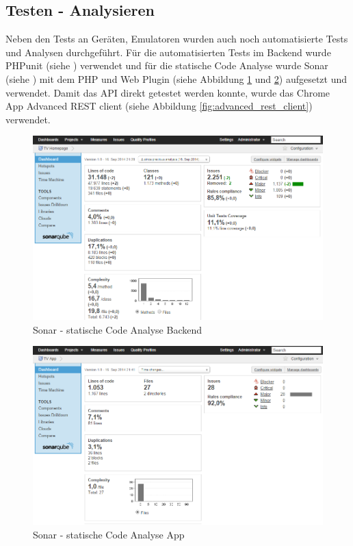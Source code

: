 \newpage
\subsection{Testen - Analysieren}
Neben den Tests an Geräten, Emulatoren wurden auch noch automatisierte Tests und Analysen durchgeführt. Für die automatisierten Tests im Backend wurde PHPunit (siehe \cite{phpunit}) verwendet und für die statische Code Analyse wurde Sonar (siehe \cite{sonar}) mit dem PHP und Web Plugin (siehe Abbildung \ref{fig:sonar_backend} und \ref{fig:sonar_app}) aufgesetzt und verwendet. Damit das API direkt getestet werden konnte, wurde das Chrome App Advanced REST client (siehe Abbildung \ref{fig:advanced_rest_client}) verwendet.

\begin{figure}[h]
\centering
\includegraphics[scale=0.5]{images/sonar_backend.png}
\caption{Sonar - statische Code Analyse Backend}
\label{fig:sonar_backend}
\end{figure}

\begin{figure}[h]
\centering
\includegraphics[scale=0.5]{images/sonar_app.png}
\caption{Sonar - statische Code Analyse App}
\label{fig:sonar_app}
\end{figure}

